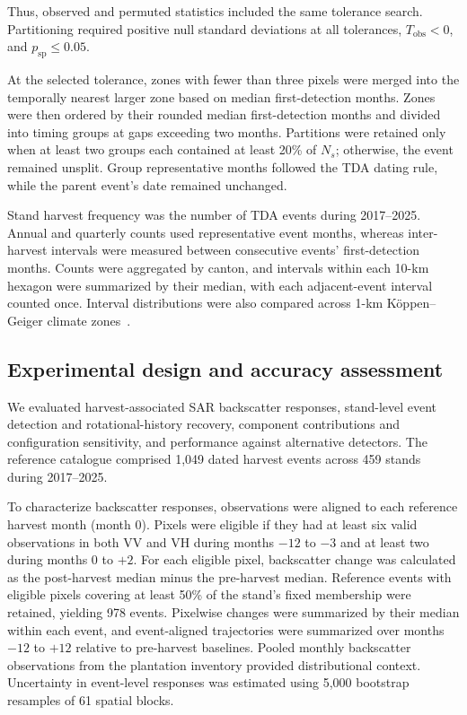 Thus, observed and permuted statistics included the same tolerance search. Partitioning required positive null standard deviations at all tolerances, $T_{\mathrm{obs}}<0$, and $p_{\mathrm{sp}}\leq0.05$.

At the selected tolerance, zones with fewer than three pixels were merged into the temporally nearest larger zone based on median first-detection months. Zones were then ordered by their rounded median first-detection months and divided into timing groups at gaps exceeding two months. Partitions were retained only when at least two groups each contained at least 20\% of $N_s$; otherwise, the event remained unsplit. Group representative months followed the TDA dating rule, while the parent event's date remained unchanged.

Stand harvest frequency was the number of TDA events during 2017--2025. Annual and quarterly counts used representative event months, whereas inter-harvest intervals were measured between consecutive events' first-detection months. Counts were aggregated by canton, and intervals within each 10-km hexagon were summarized by their median, with each adjacent-event interval counted once. Interval distributions were also compared across 1-km K\"oppen--Geiger climate zones~\citep{Beck2023KoppenGeiger}.


\subsection{Experimental design and accuracy assessment}
\label{sec:experimental_evaluation}

We evaluated harvest-associated SAR backscatter responses, stand-level event detection and rotational-history recovery, component contributions and configuration sensitivity, and performance against alternative detectors. The reference catalogue comprised 1,049 dated harvest events across 459 stands during 2017--2025.

To characterize backscatter responses, observations were aligned to each reference harvest month (month $0$). Pixels were eligible if they had at least six valid observations in both VV and VH during months $-12$ to $-3$ and at least two during months $0$ to $+2$. For each eligible pixel, backscatter change was calculated as the post-harvest median minus the pre-harvest median. Reference events with eligible pixels covering at least 50\% of the stand's fixed membership were retained, yielding 978 events. Pixelwise changes were summarized by their median within each event, and event-aligned trajectories were summarized over months $-12$ to $+12$ relative to pre-harvest baselines. Pooled monthly backscatter observations from the plantation inventory provided distributional context. Uncertainty in event-level responses was estimated using 5,000 bootstrap resamples of 61 spatial blocks.

